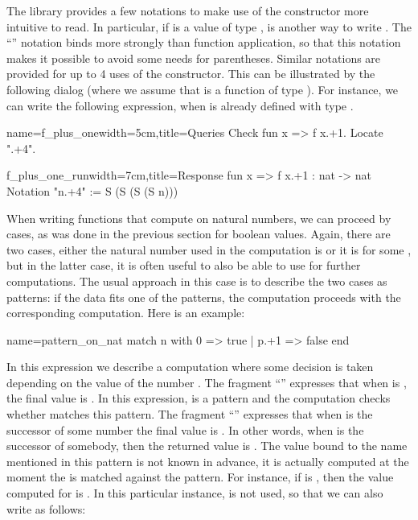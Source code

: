 The \mcbMC{} library provides a few notations to make use of the
constructor  more intuitive to read.  In particular, if 
is a value of type ,  is another way to write .  The ``'' notation binds more strongly than function
application, so that this notation makes it possible to avoid some
needs for parentheses.
Similar notations are provided for up to 4 uses of the 
constructor.  This can be illustrated by the following dialog (where
we assume that  is a function of type ).
  For instance, we can write the following
expression, when  is already defined with type .

\begin{coq}{name=f_plus_one}{width=5cm,title=Queries}
Check fun x => f x.+1.
Locate ".+4".
\end{coq}
\begin{coqout}{f_plus_one_run}{width=7cm,title=Response}
fun x => f x.+1 : nat -> nat
Notation "n.+4" := S (S (S (S n)))
\end{coqout}

When writing functions that compute on natural numbers, we can
proceed by cases, as was done in the previous section for boolean
values.  Again, there are two cases, either the natural number used in
the computation is  or it is  for
some , but in the latter case, it is often useful to also be able
to use  for further computations.  The usual approach in this
case is to describe the two cases as patterns: if the data fits one of
the patterns, the computation proceeds with the corresponding
computation.  Here is an example:

\begin{coq}{name=pattern_on_nat}{}
match n with 0 => true | p.+1 => false end
\end{coq}
In this expression we describe a computation where some decision is
taken depending on the value of the number .  The fragment 
``'' expresses that when  is , the final value is
.  In this expression,  is a pattern and the computation
checks whether  matches this pattern.  The fragment
``''  expresses that when  is the successor of
some number  the final value is .  In other words, when
 is the successor of somebody, then the returned value is
.  The value bound to the name  mentioned in this pattern is not
known in advance, it is actually computed at the moment the  is matched
against the pattern.  For instance, if  is , then the value computed
for  is .  In this particular instance,  is not used, so that we
can also write as follows:

